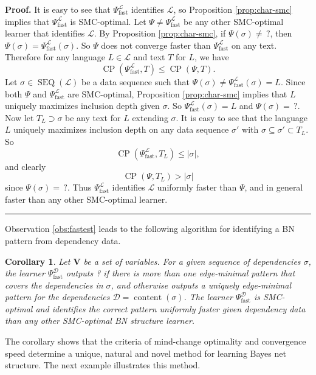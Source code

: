 \documentclass{elsarticle}%
\newtheorem{corollary}[theorem]{Corollary}
\renewenvironment{proof}[1][Proof]{\noindent\textbf{#1.} }{\ \rule{0.5em}{0.5em}}
\DeclareMathOperator{\content}{content}
\DeclareMathOperator{\SEQ}{SEQ}
\DeclareMathOperator{\CONV}{CP}
\renewcommand{\L}{\mathcal{L}}
\newcommand{\fast}{\mathrm{fast}}
\newcommand{\D}{\mathcal{D}}
\begin{document}
\begin{proof} 
It is easy to see that $\Psi_\fast^{\L}$ identifies
$\L$, so Proposition \ref{prop:char-smc} implies that $\Psi
_\fast^{\L}$ is SMC-optimal. 
Let $\Psi\neq\Psi_\fast^{\L}$
be any other SMC-optimal learner that identifies $\L$. %
By Proposition \ref{prop:char-smc}, if $\Psi(\sigma)\neq\,?$, then $\Psi
(\sigma)=\Psi_\fast^{\L}(\sigma)$. So $\Psi$ does not converge faster than $\Psi_\fast^{\L}$ on any text. 
Therefore for any language $L\in
\L$ and text $T$ for $L$, we have \[
\CONV(\Psi_\fast^{\L%
},T)\leq \CONV(\Psi,T).
\] 
Let $\sigma\in \SEQ(\L)$ be a data
sequence such that $\Psi(\sigma)\neq\Psi_\fast^{\L}(\sigma) = L$. 
Since
both $\Psi$ and $\Psi_\fast^{\L}$ are SMC-optimal, 
 Proposition
\ref{prop:char-smc} implies that %
$L$ %
uniquely maximizes inclusion depth given $\sigma$. 
So $\Psi_\fast%
^{\L}(\sigma)=L$ and $\Psi(\sigma)=\,?$. Now let $T_{L}\supset\sigma$ be
any text for $L$ extending $\sigma$. 
It is easy to see that the language $L$ uniquely maximizes inclusion depth on any data sequence
$\sigma'$ with $\sigma\subseteq\sigma'\subset T_{L}$. So
\[
\CONV(\Psi_\fast^{\L},T_{L})\leq|\sigma|,
\] and %
clearly 
\[\CONV(\Psi,T_{L})>|\sigma|\] since $\Psi(\sigma)=\, ?$.
 Thus $\Psi_\fast%
^{\L}$ identifies $\L$ uniformly faster than $\Psi$, and in
general faster than any other SMC-optimal learner.
\end{proof}

Observation \ref{obs:fastest} leads to the following algorithm for identifying a BN pattern from dependency data.

\begin{corollary} \label{cor:dep-learner}
Let $\mathbf{V}$ be a set of variables. For a given sequence of dependencies
$\sigma$, the learner $\Psi_\fast^{\D}$ outputs ? if there is more
than one edge-minimal pattern that covers the dependencies in $\sigma$, and
otherwise outputs 
a uniquely edge-minimal pattern for the
dependencies $\D=\content(\sigma)$. The learner $\Psi_\fast^{\D}$ is SMC-optimal and identifies the
correct pattern uniformly faster given dependency data than any other SMC-optimal BN structure learner.
\end{corollary}
%
The corollary shows that the criteria of mind-change optimality and convergence speed
determine a unique, natural and novel method for learning Bayes net structure. The next example illustrates this method.
\end{document}
